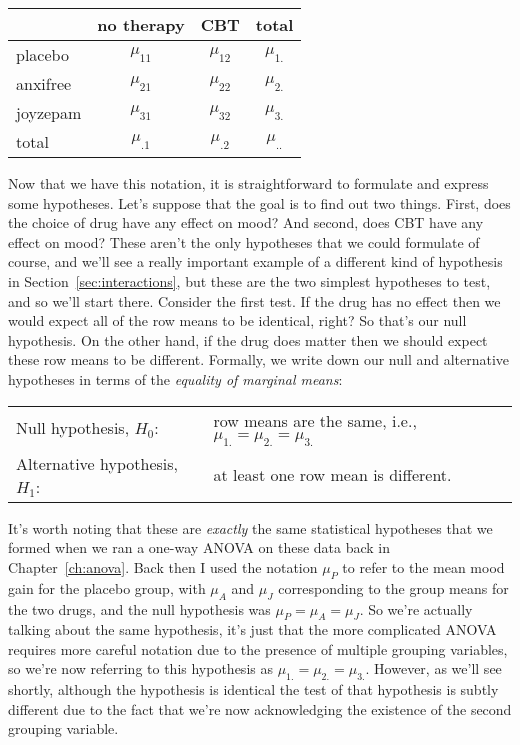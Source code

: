 \begin{center}
\begin{tabular}{l|cc|c}
& no therapy & CBT & total \\ \hline
placebo & $\mu_{11}$ & $\mu_{12}$ & $\mu_{1.}$  \\
anxifree & $\mu_{21}$ & $\mu_{22}$ & $\mu_{2.}$  \\
joyzepam & $\mu_{31}$ &$\mu_{32}$ & $\mu_{3.}$ \\ \hline
total & $\mu_{.1}$ & $\mu_{.2}$  &  $\mu_{..}$
\end{tabular}
\end{center}

Now that we have this notation, it is straightforward to formulate and express some hypotheses. Let's suppose that the goal is to find out two things. First, does the choice of drug have any effect on mood? And second, does CBT have any effect on mood? These aren't the only hypotheses that we could formulate of course, and we'll see a really important example of a different kind of hypothesis in Section~\ref{sec:interactions}, but these are the two simplest hypotheses to test, and so we'll start there. Consider the first test. If the drug has no effect then we would expect all of the row means to be identical, right? So that's our null hypothesis. On the other hand, if the drug does matter then we should expect these row means to be different. Formally, we write down our null and alternative hypotheses in terms of the {\it equality of marginal means}:

\begin{center}
\begin{tabular}{ll}
Null hypothesis, $H_0$: & row means are the same, i.e., $\mu_{1.} = \mu_{2.} = \mu_{3.}$ \\
Alternative hypothesis, $H_1$: & at least one row mean is different.
\end{tabular}
\end{center}

It's worth noting that these are {\it exactly} the same statistical hypotheses that we formed when we ran a one-way ANOVA on these data back in Chapter~\ref{ch:anova}. Back then I used the notation $\mu_P$ to refer to the mean mood gain for the placebo group, with $\mu_A$ and $\mu_J$ corresponding to the group means for the two drugs, and the null hypothesis was $\mu_P = \mu_A = \mu_J$. So we're actually talking about the same hypothesis, it's just that the more complicated ANOVA requires more careful notation due to the presence of multiple grouping variables, so we're now referring to this hypothesis as $\mu_{1.} = \mu_{2.} = \mu_{3.}$. However, as we'll see shortly, although the hypothesis is identical the test of that hypothesis is subtly different due to the fact that we're now acknowledging the existence of the second grouping variable.

